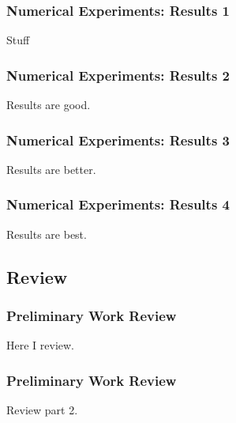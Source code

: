 \documentclass[compress,xcolor=table]{beamer}
\begin{document}
\begin{frame}
\frametitle{Numerical Experiments: Results 1}

Stuff

\end{frame}
\begin{frame}
\frametitle{Numerical Experiments: Results 2}

Results are good.

\end{frame}
\begin{frame}
\frametitle{Numerical Experiments: Results 3}

Results are better.

\end{frame}
\begin{frame}
\frametitle{Numerical Experiments: Results 4}

Results are best.

\end{frame}
\subsection[Review]{Review}
\begin{frame}
\frametitle{Preliminary Work Review}

Here I review.

\end{frame}
\begin{frame}
\frametitle{Preliminary Work Review}

Review part 2.

\end{frame}
\end{document}
